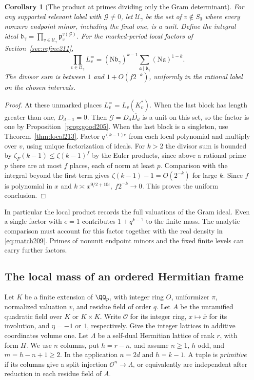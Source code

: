 \documentclass[a4paper,11pt]{article}
\newtheorem{corollary}[proposition]{Corollary}
\theoremstyle{definition}
\theoremstyle{remark}
\numberwithin{equation}{section}
\begin{document}
\begin{corollary}[The product at primes dividing only the Gram determinant]
\label{cor:product213}
For any supported relevant label with \(\mathcal G\ne0\), let
\(\mathcal U_\gamma\) be the set of \(v\notin S_0\) where every
nonzero endpoint minor, including the final one, is a unit.
Define the integral ideal
\(\mathfrak b_\gamma=\prod_{v\in\mathcal U_\gamma}
 \mathfrak p_v^{v(\mathcal G)}\). For the marked-period local
factors of Section~\ref{sec:refine211},
\[
 \prod_{v\in\mathcal U_\gamma}L_v^{=}
 =(\mathrm N\mathfrak b_\gamma)^{k-1}
       \sum_{\mathfrak a\mid\mathfrak b_\gamma}
                         (\mathrm N\mathfrak a)^{1-k}.
\]
The divisor sum is between \(1\) and \(1+O(f2^{-k})\),
uniformly in the rational label on the chosen intervals.
\end{corollary}
\begin{proof}
At these unmarked places \(L_v^{=}=L_v(K_v^*)\). When the last
block has length greater than one, \(D_{d-1}=0\). Then
\(\mathcal G=D_d\overline{D_d}\) is a unit on this set, so the
factor is one by Proposition~\ref{prop:good205}. When the last
block is a singleton, use Theorem~\ref{thm:local213}.
Factor \(q^{(k-1)e}\) from each local polynomial and multiply
over \(v\), using unique factorization of ideals. For \(k>2\)
the divisor sum is bounded by \(\zeta_F(k-1)\le\zeta(k-1)^f\)
by the Euler products, since above a rational prime \(p\) there are
at most \(f\) places, each of norm at least \(p\).
Comparison with the integral beyond the first term gives
\(\zeta(k-1)-1=O(2^{-k})\) for large \(k\). Since \(f\) is
polynomial in \(x\) and \(k\asymp x^{9/2+10\epsilon}\),
\(f2^{-k}\to0\). This proves the uniform conclusion.
\end{proof}

In particular the local product records the full valuations of
the Gram ideal. Even a single factor with \(e=1\) contributes
\(1+q^{k-1}\) to the finite mass. The analytic comparison must
account for this factor together with the real density in
\eqref{eq:match209}. Primes of nonunit endpoint minors and the
fixed finite levels can carry further factors.

\subsection{The local mass of an ordered Hermitian frame}\label{nav:IX-07}
\label{sec:frames215}

Let \(K\) be a finite extension of \(\QQ_p\), with integer ring
\(O\), uniformizer \(\pi\), normalized valuation \(v\), and
residue field of order \(q\). Let \(A\) be the unramified
quadratic field over \(K\) or \(K\times K\). Write
\(\mathcal O\) for its integer ring, \(x\mapsto\bar x\) for its
involution, and \(\eta=-1\) or \(1\), respectively. Give the
integer lattices in additive coordinates volume one. Let
\(\Lambda\) be a self-dual Hermitian lattice of rank \(r\), with
form \(H\). We use \(n\) columns, put \(h=r-n\), and assume
\(n\ge1\), \(h\) odd, and \(m=h-n+1\ge2\). In the application
\(n=2d\) and \(h=k-1\). A tuple is \emph{primitive} if its columns
give a split injection \(\mathcal O^n\to\Lambda\), or equivalently
are independent after reduction in each residue field of \(A\).
\end{document}
